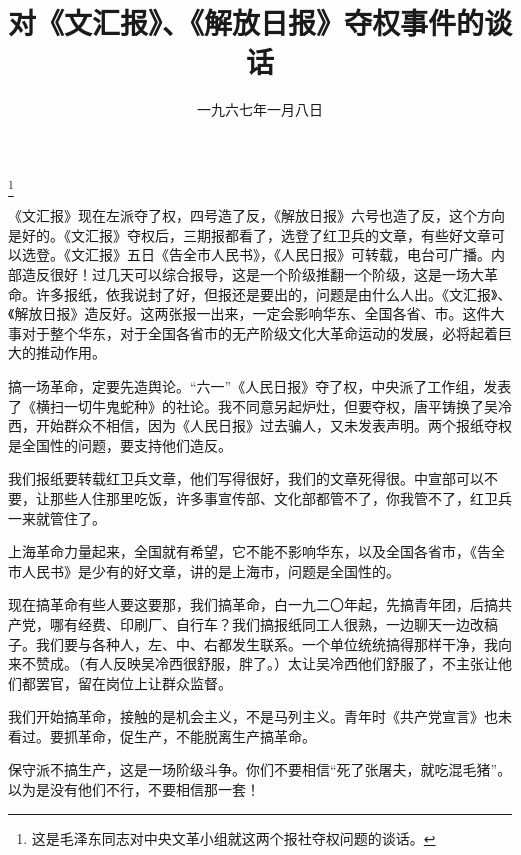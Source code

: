 
\title{对《文汇报》、《解放日报》夺权事件的谈话}
\date{一九六七年一月八日}
\thanks{这是毛泽东同志对中央文革小组就这两个报社夺权问题的谈话。}
\maketitle


《文汇报》现在左派夺了权，四号造了反，《解放日报》六号也造了反，这个方向是好的。《文汇报》夺权后，三期报都看了，选登了红卫兵的文章，有些好文章可以选登。《文汇报》五日《告全市人民书》，《人民日报》可转载，电台可广播。内部造反很好！过几天可以综合报导，这是一个阶级推翻一个阶级，这是一场大革命。许多报纸，依我说封了好，但报还是要出的，问题是由什么人出。《文汇报》、《解放日报》造反好。这两张报一出来，一定会影响华东、全国各省、市。这件大事对于整个华东，对于全国各省市的无产阶级文化大革命运动的发展，必将起着巨大的推动作用。

搞一场革命，定要先造舆论。“六一”《人民日报》夺了权，中央派了工作组，发表了《横扫一切牛鬼蛇种》的社论。我不同意另起炉灶，但要夺权，唐平铸换了吴冷西，开始群众不相信，因为《人民日报》过去骗人，又未发表声明。两个报纸夺权是全国性的问题，要支持他们造反。

我们报纸要转载红卫兵文章，他们写得很好，我们的文章死得很。中宣部可以不要，让那些人住那里吃饭，许多事宣传部、文化部都管不了，你我管不了，红卫兵一来就管住了。

上海革命力量起来，全国就有希望，它不能不影响华东，以及全国各省市，《告全市人民书》是少有的好文章，讲的是上海市，问题是全国性的。

现在搞革命有些人要这要那，我们搞革命，白一九二〇年起，先搞青年团，后搞共产党，哪有经费、印刷厂、自行车？我们搞报纸同工人很熟，一边聊天一边改稿子。我们要与各种人，左、中、右都发生联系。一个单位统统搞得那样干净，我向来不赞成。（有人反映吴冷西很舒服，胖了。）太让吴冷西他们舒服了，不主张让他们都罢官，留在岗位上让群众监督。

我们开始搞革命，接触的是机会主义，不是马列主义。青年时《共产党宣言》也未看过。要抓革命，促生产，不能脱离生产搞革命。

保守派不搞生产，这是一场阶级斗争。你们不要相信“死了张屠夫，就吃混毛猪”。以为是没有他们不行，不要相信那一套！

